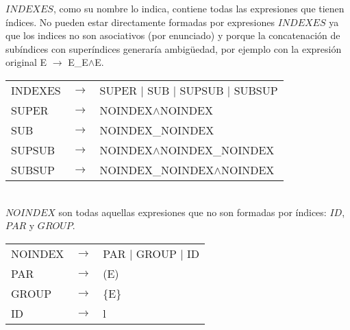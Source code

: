 $INDEXES$, como su nombre lo indica, contiene todas las expresiones que tienen \'indices. No pueden estar directamente formadas por expresiones $INDEXES$ ya que los indices no son asociativos (por enunciado) y porque la concatenaci\'on
de sub\'indices con super\'indices generar\'ia ambig\"uedad, por ejemplo con la expresi\'on original E $\rightarrow$ E\_E$\wedge$E. \\


\begin{tabular}{ l c l }
    INDEXES &  $\rightarrow$ & SUPER $|$ SUB $|$ SUPSUB $|$ SUBSUP \\
    SUPER &    $\rightarrow$ & NOINDEX$\wedge$NOINDEX \\
    SUB &      $\rightarrow$ & NOINDEX\_NOINDEX \\
    SUPSUB &   $\rightarrow$ & NOINDEX$\wedge$NOINDEX\_NOINDEX \\
    SUBSUP &   $\rightarrow$ & NOINDEX\_NOINDEX$\wedge$NOINDEX \\
\end{tabular}\\

$NOINDEX$ son todas aquellas expresiones que no son formadas por \'indices: $ID$, $PAR$ y $GROUP$. \\


\begin{tabular}{ l c l }
    NOINDEX &  $\rightarrow$ & PAR $|$ GROUP $|$ ID \\    
    PAR &      $\rightarrow$ & (E) \\
    GROUP &    $\rightarrow$ & \{E\} \\
    ID &       $\rightarrow$ & l \\
\end{tabular} \\
